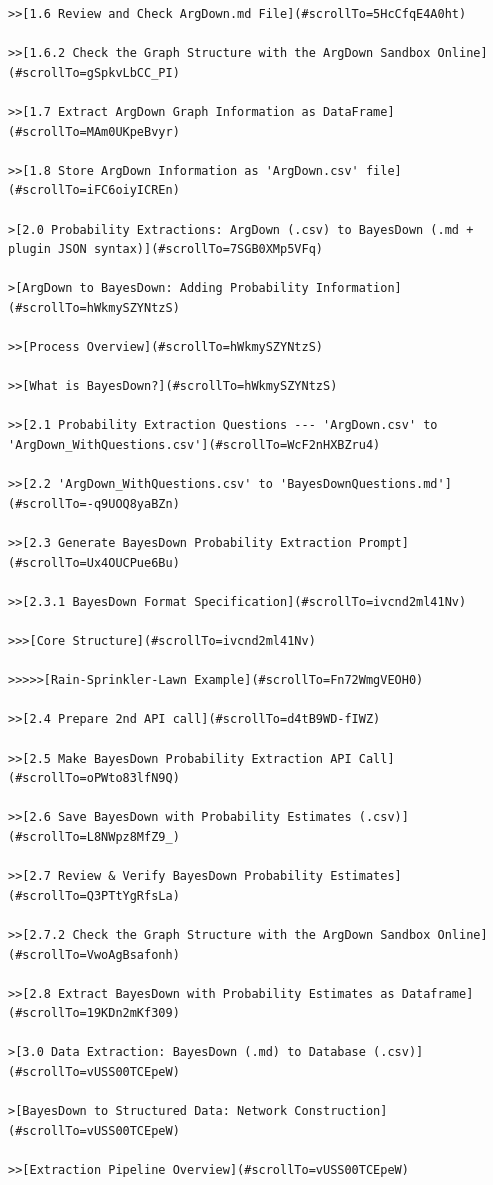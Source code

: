 \documentclass[
  11pt,
  letterpaper,
]{book}
\begin{document}
\begin{verbatim}
>>[1.6 Review and Check ArgDown.md File](#scrollTo=5HcCfqE4A0ht)

>>[1.6.2 Check the Graph Structure with the ArgDown Sandbox Online](#scrollTo=gSpkvLbCC_PI)

>>[1.7 Extract ArgDown Graph Information as DataFrame](#scrollTo=MAm0UKpeBvyr)

>>[1.8 Store ArgDown Information as 'ArgDown.csv' file](#scrollTo=iFC6oiyICREn)

>[2.0 Probability Extractions: ArgDown (.csv) to BayesDown (.md + plugin JSON syntax)](#scrollTo=7SGB0XMp5VFq)

>[ArgDown to BayesDown: Adding Probability Information](#scrollTo=hWkmySZYNtzS)

>>[Process Overview](#scrollTo=hWkmySZYNtzS)

>>[What is BayesDown?](#scrollTo=hWkmySZYNtzS)

>>[2.1 Probability Extraction Questions --- 'ArgDown.csv' to 'ArgDown_WithQuestions.csv'](#scrollTo=WcF2nHXBZru4)

>>[2.2 'ArgDown_WithQuestions.csv' to 'BayesDownQuestions.md'](#scrollTo=-q9UOQ8yaBZn)

>>[2.3 Generate BayesDown Probability Extraction Prompt](#scrollTo=Ux4OUCPue6Bu)

>>[2.3.1 BayesDown Format Specification](#scrollTo=ivcnd2ml41Nv)

>>>[Core Structure](#scrollTo=ivcnd2ml41Nv)

>>>>>[Rain-Sprinkler-Lawn Example](#scrollTo=Fn72WmgVEOH0)

>>[2.4 Prepare 2nd API call](#scrollTo=d4tB9WD-fIWZ)

>>[2.5 Make BayesDown Probability Extraction API Call](#scrollTo=oPWto83lfN9Q)

>>[2.6 Save BayesDown with Probability Estimates (.csv)](#scrollTo=L8NWpz8MfZ9_)

>>[2.7 Review & Verify BayesDown Probability Estimates](#scrollTo=Q3PTtYgRfsLa)

>>[2.7.2 Check the Graph Structure with the ArgDown Sandbox Online](#scrollTo=VwoAgBsafonh)

>>[2.8 Extract BayesDown with Probability Estimates as Dataframe](#scrollTo=19KDn2mKf309)

>[3.0 Data Extraction: BayesDown (.md) to Database (.csv)](#scrollTo=vUSS00TCEpeW)

>[BayesDown to Structured Data: Network Construction](#scrollTo=vUSS00TCEpeW)

>>[Extraction Pipeline Overview](#scrollTo=vUSS00TCEpeW)


\end{verbatim}
\end{document}
